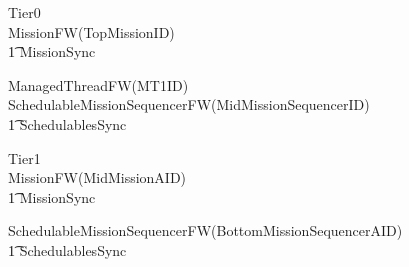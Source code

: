\begin{circus}
\circprocess Tier0 \circdef \\

\circblockopen
	MissionFW(TopMissionID)\\
		\t1 	\lpar MissionSync \rpar \\
		\circblockopen



			ManagedThreadFW(MT1ID)\\






			SchedulableMissionSequencerFW(MidMissionSequencerID)\\
\t1 \lpar SchedulablesSync \rpar\\



		\circblockclose
\circblockclose
\end{circus}
%
\begin{circus}
\circprocess Tier1 \circdef \\

\circblockopen
	MissionFW(MidMissionAID)\\
		\t1 	\lpar MissionSync \rpar \\
		\circblockopen









			SchedulableMissionSequencerFW(BottomMissionSequencerAID)\\
\t1 \lpar SchedulablesSync \rpar\\



		\circblockclose
\circblockclose
\end{circus}
%
